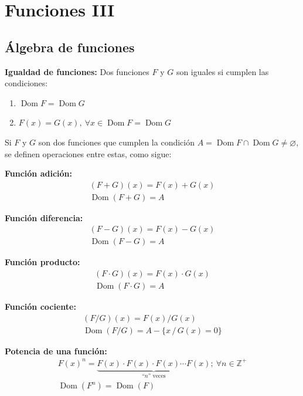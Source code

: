 \documentclass[11pt,a4paper]{article}
\begin{document}
\newpage
\section{Funciones III}

\subsection*{Álgebra de funciones}

\textbf{Igualdad de funciones:} Dos funciones $F$ y $G$ son iguales si cumplen las condiciones:
\begin{enumerate}[label=\roman*)]
  \item $\operatorname{Dom}F = \operatorname{Dom}G$
  \item $F(x) = G(x),\ \forall x \in \operatorname{Dom}F = \operatorname{Dom}G$
\end{enumerate}

Si $F$ y $G$ son dos funciones que cumplen la condición
$A = \operatorname{Dom}F \cap \operatorname{Dom}G \neq \varnothing$, se definen operaciones
entre estas, como sigue:

\begin{minipage}[t]{0.320\textwidth}
\textbf{Función adición:}
\begin{gather*}
(F + G)(x) = F(x) + G(x)\\
\operatorname{Dom}(F + G) = A
\end{gather*}
\end{minipage}\hfill
\begin{minipage}[t]{0.320\textwidth}
\textbf{Función diferencia:}
\begin{gather*}
(F - G)(x) = F(x) - G(x)\\
\operatorname{Dom}(F - G) = A
\end{gather*}
\end{minipage}\hfill
\begin{minipage}[t]{0.320\textwidth}
\textbf{Función producto:}
\begin{gather*}
(F\cdot G)(x) = F(x)\cdot G(x)\\
\operatorname{Dom}(F\cdot G) = A
\end{gather*}
\end{minipage}

\begin{minipage}[t]{0.388\textwidth}
\textbf{Función cociente:}
\begin{gather*}
(F/G)(x) = F(x)/G(x)\\
\operatorname{Dom}(F/G) = A - \{x \,/\, G(x) = 0\}
\end{gather*}
\end{minipage}\hfill
\begin{minipage}[t]{0.582\textwidth}
\textbf{Potencia de una función:}
\begin{gather*}
F(x)^n = \underbrace{F(x)\cdot F(x)\cdot F(x)\cdots F(x)}_{\text{``$n$'' veces}};\ \forall n \in \mathbb{Z}^+\\
\operatorname{Dom}(F^n) = \operatorname{Dom}(F)
\end{gather*}
\end{minipage}
\end{document}
